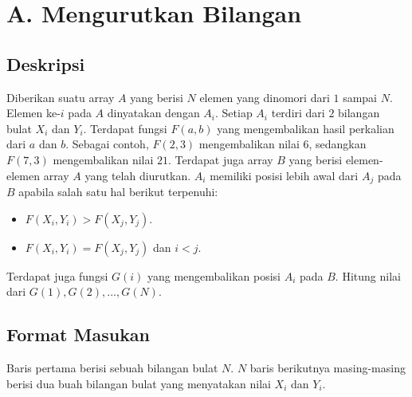 \documentclass{article}
\begin{document}
\section*{\hfil A. Mengurutkan Bilangan\hfil}


\pagestyle{fancy}
\fancyhf{}
\renewcommand{\headrulewidth}{0pt}

\subsection*{Deskripsi}

\par\noindent Diberikan suatu array $A$ yang berisi $N$ elemen yang dinomori dari $1$ sampai $N$. Elemen ke-$i$ pada $A$ dinyatakan dengan $A_i$. Setiap $A_i$ terdiri dari $2$ bilangan bulat $X_i$ dan $Y_i$. Terdapat fungsi $F(a,b)$ yang mengembalikan hasil perkalian dari $a$ dan $b$. Sebagai contoh, $F(2,3)$ mengembalikan nilai $6$, sedangkan $F(7,3)$ mengembalikan nilai $21$. Terdapat juga array $B$ yang berisi elemen-elemen array $A$ yang telah diurutkan. $A_i$ memiliki posisi lebih awal dari $A_j$ pada $B$ apabila salah satu hal berikut terpenuhi:

\begin{itemize}
	\item $F(X_i,Y_i) > F(X_j, Y_j)$.
	\item $F(X_i,Y_i) = F(X_j, Y_j)$ dan $i < j$.
\end{itemize}

\par\noindent Terdapat juga fungsi $G(i)$ yang mengembalikan posisi $A_i$ pada $B$. Hitung nilai dari $G(1), G(2), ... , G(N)$. 

\subsection*{Format Masukan}

\par\noindent Baris pertama berisi sebuah bilangan bulat $N$. $N$ baris berikutnya masing-masing berisi dua buah bilangan bulat yang menyatakan nilai $X_i$ dan $Y_i$.
\end{document}
